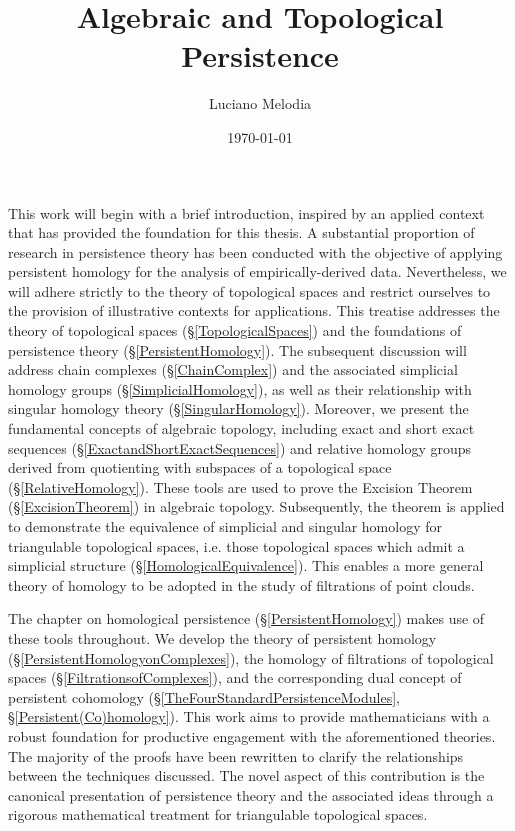 \documentclass[b5paper, 11pt, twoside]{report}
\title{Algebraic and Topological Persistence}
\author{Luciano Melodia}
\date{\today}
\begin{document}
\vspace{0.5cm}


This work will begin with a brief introduction, inspired by an applied context that has provided the foundation for this thesis.  A substantial proportion of research in persistence theory has been conducted with the objective of applying persistent homology for the analysis of empirically-derived data. Nevertheless, we will adhere strictly to the theory of topological spaces and restrict ourselves to the provision of illustrative contexts for applications. This treatise addresses the theory of topological spaces (\S \ref{TopologicalSpaces}) and the foundations of persistence theory (\S \ref{PersistentHomology}). The subsequent discussion will address chain complexes (\S \ref{ChainComplex}) and the associated simplicial homology groups (\S \ref{SimplicialHomology}), as well as their relationship with singular homology theory (\S \ref{SingularHomology}). Moreover, we present the fundamental concepts of algebraic topology, including exact and short exact sequences (\S \ref{ExactandShortExactSequences}) and relative homology groups derived from quotienting with subspaces of a topological space (\S \ref{RelativeHomology}). These tools are used to prove the Excision Theorem (\S \ref{ExcisionTheorem}) in algebraic topology. Subsequently, the theorem is applied to demonstrate the equivalence of simplicial and singular homology for triangulable topological spaces, i.e. those topological spaces which admit a simplicial structure (\S \ref{HomologicalEquivalence}). This enables a more general theory of homology to be adopted in the study of filtrations of point clouds.

The chapter on homological persistence (\S \ref{PersistentHomology}) makes use of these tools throughout. We develop the theory of persistent homology (\S \ref{PersistentHomologyonComplexes}), the homology of filtrations of topological spaces (\S \ref{FiltrationsofComplexes}), and the corresponding dual concept of persistent cohomology (\S \ref{TheFourStandardPersistenceModules}, \S \ref{Persistent(Co)homology}). This work aims to provide mathematicians with a robust foundation for productive engagement with the aforementioned theories. The majority of the proofs have been rewritten to clarify the relationships between the techniques discussed. The novel aspect of this contribution is the canonical presentation of persistence theory and the associated ideas through a rigorous mathematical treatment for triangulable topological spaces.
\end{document}
